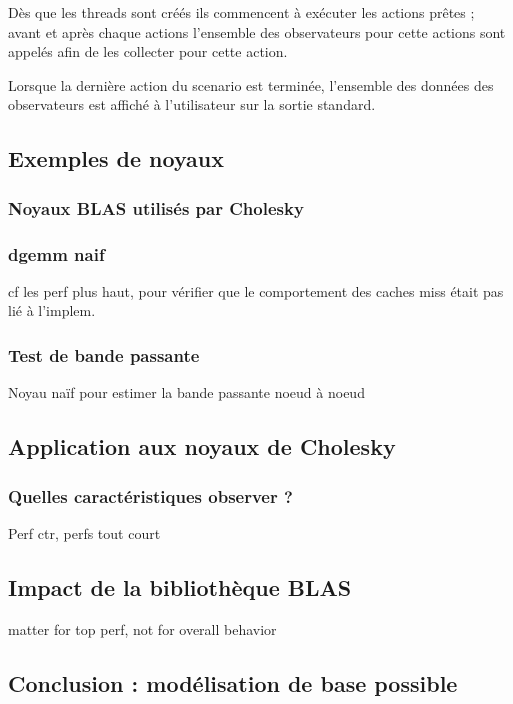 Dès que les threads sont créés ils commencent à exécuter les actions prêtes ; avant et après chaque actions l'ensemble des observateurs pour cette actions sont appelés afin de les collecter pour cette action.

Lorsque la dernière action du scenario est terminée, l'ensemble des données des observateurs est affiché à l'utilisateur sur la sortie standard.

\subsection{Exemples de noyaux}

\subsubsection{Noyaux BLAS utilisés par Cholesky}

\subsubsection{dgemm naif}

cf les perf plus haut, pour vérifier que le comportement des caches miss était pas lié à l'implem.

\subsubsection{Test de bande passante}

Noyau naïf pour estimer la bande passante noeud à noeud

\subsection{Application aux noyaux de Cholesky}

\subsubsection{Quelles caractéristiques observer ?}
Perf ctr, perfs tout court

\subsection{Impact de la bibliothèque BLAS}

matter for top perf, not for overall behavior

\subsection{Conclusion : modélisation de base possible}

